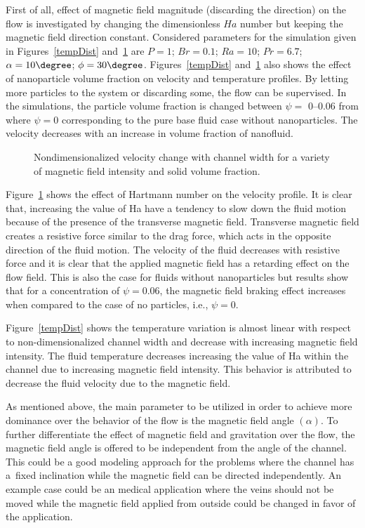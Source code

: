 First of all, effect of magnetic field magnitude (discarding the direction) on the flow is investigated by changing the dimensionless $Ha$ number but keeping the magnetic field direction constant.  Considered parameters for the simulation given in Figures~\ref{tempDist} and~\ref{velDist} are $P = 1$; $Br = 0.1$; $Ra = 10$;  $Pr = 6.7$;  $\alpha  = 10\degree$;  $\phi = 30\degree$. Figures~\ref{tempDist} and~\ref{velDist} also shows the effect of nanoparticle volume fraction on velocity and temperature profiles. By letting more particles to the system or discarding some, the flow can be supervised. In the simulations, the particle volume fraction is changed between $\psi =$ 0--0.06  from  where $\psi  =0$ corresponding to the pure base fluid case without nanoparticles. The velocity decreases with an increase in volume fraction of nanofluid. %

\begin{figure}
\centerline{}
\vspace*{5mm}
\caption{Nondimensionalized velocity change with channel width for a variety of magnetic field intensity and solid volume fraction.}
\label{velDist} 
\end{figure}

 Figure~\ref{velDist} shows the effect of Hartmann number on the velocity profile. It is clear that, increasing the value of Ha have a tendency to slow down the fluid motion because of the presence of the transverse magnetic field. Transverse magnetic field creates a resistive force similar to the drag force, which acts in the opposite direction of the fluid motion. The velocity of the fluid decreases with resistive force and it is clear that the applied magnetic field has a retarding effect on the flow field. This is also the case for fluids without nanoparticles but results show that for a concentration of $\psi  =0.06$, the magnetic field braking effect increases when compared to the case of no particles, i.e., $\psi  =0$. 
 
 Figure~\ref{tempDist} shows the temperature variation is almost linear with respect to non-dimensionalized channel width and decrease with increasing magnetic field intensity. The fluid temperature decreases increasing the value of Ha within the channel due to increasing magnetic field intensity. This behavior is attributed to decrease the fluid velocity due to the magnetic field.


As mentioned above, the main parameter to be utilized in order to achieve more dominance over the behavior of the flow is the magnetic field angle $(\alpha)$. To further differentiate the effect of magnetic field and gravitation over the flow, the magnetic field angle is offered to be independent from the angle of the channel. This could be a good modeling approach for the problems where the channel has a~fixed inclination while the magnetic field can be directed independently. An example case could be an medical application where the veins should not be moved while the magnetic field applied from outside could be changed in favor of the application. 


